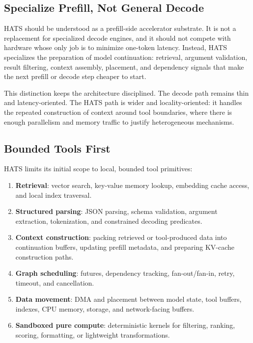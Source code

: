\documentclass[11pt]{article}
\begin{document}
\subsection{Specialize Prefill, Not General Decode}

HATS should be understood as a prefill-side accelerator substrate. It is not a
replacement for specialized decode engines, and it should not compete with
hardware whose only job is to minimize one-token latency. Instead, HATS
specializes the preparation of model continuation: retrieval, argument
validation, result filtering, context assembly, placement, and dependency
signals that make the next prefill or decode step cheaper to start.

This distinction keeps the architecture disciplined. The decode path remains
thin and latency-oriented. The HATS path is wider and locality-oriented: it
handles the repeated construction of context around tool boundaries, where
there is enough parallelism and memory traffic to justify heterogeneous
mechanisms.

\subsection{Bounded Tools First}

HATS limits its initial scope to local, bounded tool primitives:

\begin{enumerate}[leftmargin=*]
  \item \textbf{Retrieval}: vector search, key-value memory lookup, embedding
        cache access, and local index traversal.
  \item \textbf{Structured parsing}: JSON parsing, schema validation, argument
        extraction, tokenization, and constrained decoding predicates.
  \item \textbf{Context construction}: packing retrieved or tool-produced data
        into continuation buffers, updating prefill metadata, and preparing
        KV-cache construction paths.
  \item \textbf{Graph scheduling}: futures, dependency tracking, fan-out/fan-in,
        retry, timeout, and cancellation.
  \item \textbf{Data movement}: DMA and placement between model state, tool
        buffers, indexes, CPU memory, storage, and network-facing buffers.
  \item \textbf{Sandboxed pure compute}: deterministic kernels for filtering,
        ranking, scoring, formatting, or lightweight transformations.
\end{enumerate}
\end{document}
